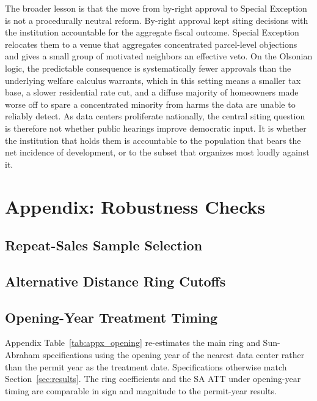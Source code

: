 \documentclass[12pt]{article}
\begin{document}
The broader lesson is that the move from by-right approval to Special Exception is not a procedurally neutral reform. By-right approval kept siting decisions with the institution accountable for the aggregate fiscal outcome. Special Exception relocates them to a venue that aggregates concentrated parcel-level objections and gives a small group of motivated neighbors an effective veto. On the Olsonian logic, the predictable consequence is systematically fewer approvals than the underlying welfare calculus warrants, which in this setting means a smaller tax base, a slower residential rate cut, and a diffuse majority of homeowners made worse off to spare a concentrated minority from harms the data are unable to reliably detect. As data centers proliferate nationally, the central siting question is therefore not whether public hearings improve democratic input. It is whether the institution that holds them is accountable to the population that bears the net incidence of development, or to the subset that organizes most loudly against it.


\newpage
\appendix
\section{Appendix: Robustness Checks}
\label{sec:appendix}

\subsection{Repeat-Sales Sample Selection}
\label{sec:appx_balance}



\subsection{Alternative Distance Ring Cutoffs}
\label{sec:appx_alt_rings}



\subsection{Opening-Year Treatment Timing}
\label{sec:appx_opening}

Appendix Table~\ref{tab:appx_opening} re-estimates the main ring and Sun-Abraham specifications using the opening year of the nearest data center rather than the permit year as the treatment date. Specifications otherwise match Section~\ref{sec:results}. The ring coefficients and the SA ATT under opening-year timing are comparable in sign and magnitude to the permit-year results.
\end{document}
